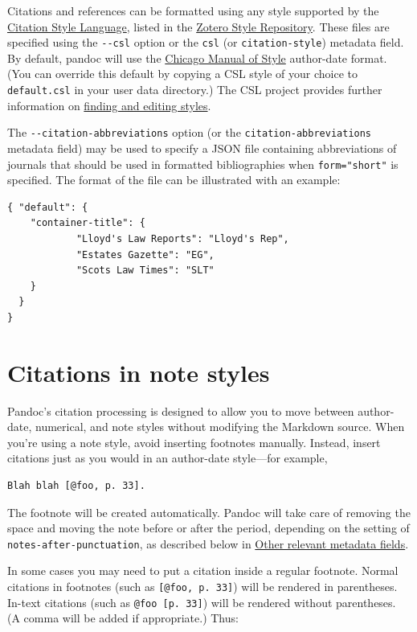 \documentclass[
  b5paper
]{book}
\begin{document}
Citations and references can be formatted using any style supported by
the \href{https://citationstyles.org}{Citation Style Language}, listed
in the \href{https://www.zotero.org/styles}{Zotero Style Repository}.
These files are specified using the \texttt{-\/-csl} option or the
\texttt{csl} (or \texttt{citation-style}) metadata field. By default,
pandoc will use the \href{https://chicagomanualofstyle.org}{Chicago
Manual of Style} author-date format. (You can override this default by
copying a CSL style of your choice to \texttt{default.csl} in your user
data directory.) The CSL project provides further information on
\href{https://citationstyles.org/authors/}{finding and editing styles}.

The \texttt{-\/-citation-abbreviations} option (or the
\texttt{citation-abbreviations} metadata field) may be used to specify a
JSON file containing abbreviations of journals that should be used in
formatted bibliographies when \texttt{form="short"} is specified. The
format of the file can be illustrated with an example:

\begin{verbatim}
{ "default": {
    "container-title": {
            "Lloyd's Law Reports": "Lloyd's Rep",
            "Estates Gazette": "EG",
            "Scots Law Times": "SLT"
    }
  }
}
\end{verbatim}

\section{Citations in note styles}\label{citations-in-note-styles}

Pandoc's citation processing is designed to allow you to move between
author-date, numerical, and note styles without modifying the Markdown
source. When you're using a note style, avoid inserting footnotes
manually. Instead, insert citations just as you would in an author-date
style---for example,

\begin{verbatim}
Blah blah [@foo, p. 33].
\end{verbatim}

The footnote will be created automatically. Pandoc will take care of
removing the space and moving the note before or after the period,
depending on the setting of \texttt{notes-after-punctuation}, as
described below in \hyperref[other-relevant-metadata-fields]{Other
relevant metadata fields}.

In some cases you may need to put a citation inside a regular footnote.
Normal citations in footnotes (such as \texttt{{[}@foo,\ p.\ 33{]}})
will be rendered in parentheses. In-text citations (such as
\texttt{@foo\ {[}p.\ 33{]}}) will be rendered without parentheses. (A
comma will be added if appropriate.) Thus:
\end{document}
